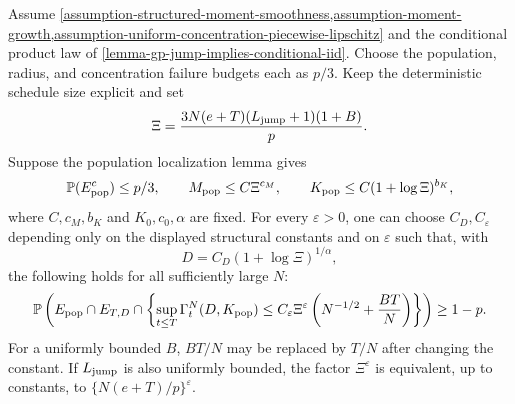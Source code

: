 \begin{lemma}
\label{lemma-uniform-sup-gamma-bound-convenient}
Assume \cref{assumption-structured-moment-smoothness,assumption-moment-growth,assumption-uniform-concentration-piecewise-lipschitz}
and the conditional product law of
\cref{lemma-gp-jump-implies-conditional-iid}. Choose the population,
radius, and concentration failure budgets each as $p/3$.
Keep the deterministic schedule size explicit and set
\[
 \Xi=\frac{3N(e+T)(L_{\mathrm{jump}}+1)(1+B)}p.
\]
Suppose the population localization lemma gives
\[
 \mathbb P(E_{\rm pop}^c)\le p/3,\qquad
 M_{\rm pop}\le C\Xi^{c_M},\qquad
 K_{\rm pop}\le C(1+\log\Xi)^{b_K},
\]
where $C,c_M,b_K$ and $K_0,c_0,\alpha$ are fixed.
For every $\varepsilon>0$, one can choose $C_D,C_\varepsilon$ depending
only on the displayed structural constants and on $\varepsilon$ such
that, with
\begin{equation}
\label{eq:def-DNTP}
 D=C_D(1+\log\Xi)^{1/\alpha},
\end{equation}
the following holds for all sufficiently large $N$:
\[
 \mathbb P\left(
  E_{\rm pop}\cap E_{T,D}\cap
  \left\{\sup_{t\le T}\Gamma_t^N(D,K_{\rm pop})
    \le C_\varepsilon\Xi^\varepsilon
          \left(N^{-1/2}+\frac{BT}{N}\right)\right\}
 \right)\ge1-p.
\]
For a uniformly bounded $B$, $BT/N$ may be replaced by $T/N$ after
changing the constant.  If $L_{\mathrm{jump}}$ is also uniformly bounded, the factor
$\Xi^\varepsilon$ is equivalent, up to constants, to
$\{N(e+T)/p\}^\varepsilon$.
\end{lemma}
